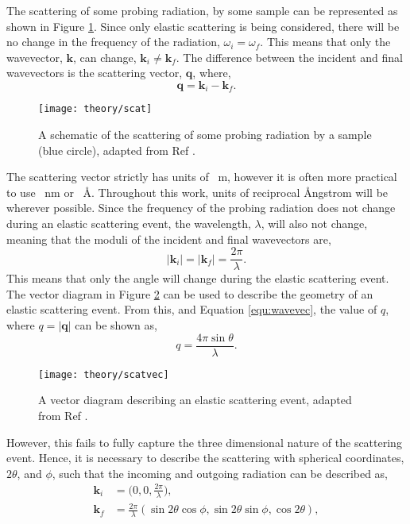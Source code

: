 The scattering of some probing radiation, by some sample can be represented as shown in Figure \ref{fig:scat}. Since only elastic scattering is being considered, there will be no change in the frequency of the radiation, $\omega_i = \omega_f$. This means that only the wavevector, $\mathbf{k}$, can change, $\mathbf{k}_i\neq \mathbf{k}_f$. The difference between the incident and final wavevectors is the scattering vector, $\mathbf{q}$, where,
%
\begin{equation}
	\mathbf{q} = \mathbf{k}_i - \mathbf{k}_f.
\end{equation}
%
%
\begin{figure}
	\centering
	\texttt{[image: theory/scat]}
	\caption{A schematic of the scattering of some probing radiation by a sample (blue circle), adapted from Ref \cite{Sivia2011}.}
	\label{fig:scat}
\end{figure}
%
The scattering vector strictly has units of \si{\per\meter}, however it is often more practical to use \si{\per\nano\meter} or \si{\per\angstrom}. Throughout this work, units of reciprocal \AA ngstrom will be wherever possible. Since the frequency of the probing radiation does not change during an elastic scattering event, the wavelength, $\lambda$, will also not change, meaning that the moduli of the incident and final wavevectors are,
%
\begin{equation}
	|\mathbf{k}_i| = |\mathbf{k}_f|=\frac{2\pi}{\lambda}.
	\label{equ:wavevec}
\end{equation}
%
This means that only the angle will change during the elastic scattering event. The vector diagram in Figure \ref{fig:scatvec} can be used to describe the geometry of an elastic scattering event. From this, and Equation \ref{equ:wavevec}, the value of $q$, where $q = |\mathbf{q}|$ can be shown as,
%
\begin{equation}
	q = \frac{4\pi\sin{\theta}}{\lambda}.
\end{equation}
%
\begin{figure}
	\centering
	\texttt{[image: theory/scatvec]}
	\caption{A vector diagram describing an elastic scattering event, adapted from Ref \cite{Sivia2011}.}
	\label{fig:scatvec}
\end{figure}
%
However, this fails to fully capture the three dimensional nature of the scattering event. Hence, it is necessary to describe the scattering with spherical coordinates, $2\theta$, and $\phi$, such that the incoming and outgoing radiation can be described as,
%
\begin{equation}
	\begin{aligned}
		\mathbf{k}_i & = \bigg(0, 0, \frac{2\pi}{\lambda}\bigg), \\
		\mathbf{k}_f & = \frac{2\pi}{\lambda}(\sin{2\theta}\cos{\phi}, \sin{2\theta}\sin{\phi}, \cos{2\theta}),
	\end{aligned}
\end{equation}

